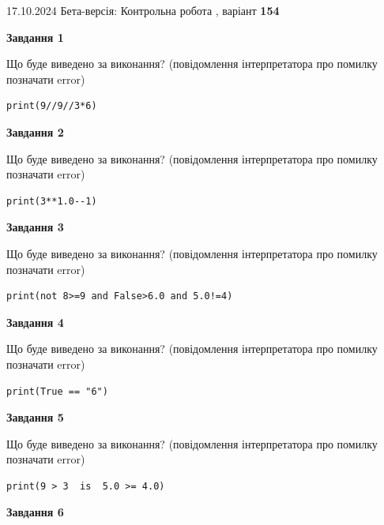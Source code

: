 \documentclass[12pt, ukrainian]{article}
\begin{document}
{\Large{17.10.2024 Бета-версія: Контрольна робота , варіант  \No \textbf { 154 }\par}}
{
\begin {large}
{\begin {center}\textbf{Завдання 1}\end {center}}

Що буде виведено за виконання? (повідомлення інтерпретатора про помилку позначати error)\par
\begin{verbatim}
print(9//9//3*6)
\end{verbatim}

{\begin {center}\textbf{Завдання 2}\end {center}}

Що буде виведено за виконання? (повідомлення інтерпретатора про помилку позначати error)\par
\begin{verbatim}
print(3**1.0--1)
\end{verbatim}

{\begin {center}\textbf{Завдання 3}\end {center}}

Що буде виведено за виконання? (повідомлення інтерпретатора про помилку позначати error)\par
\begin{verbatim}
print(not 8>=9 and False>6.0 and 5.0!=4)
\end{verbatim}

{\begin {center}\textbf{Завдання 4}\end {center}}

Що буде виведено за виконання? (повідомлення інтерпретатора про помилку позначати error)\par
\begin{verbatim}
print(True == "6")
\end{verbatim}

{\begin {center}\textbf{Завдання 5}\end {center}}

Що буде виведено за виконання? (повідомлення інтерпретатора про помилку позначати error)\par
\begin{verbatim}
print(9 > 3  is  5.0 >= 4.0)
\end{verbatim}

{\begin {center}\textbf{Завдання 6}\end {center}}


\end{large}}
\end{document}
